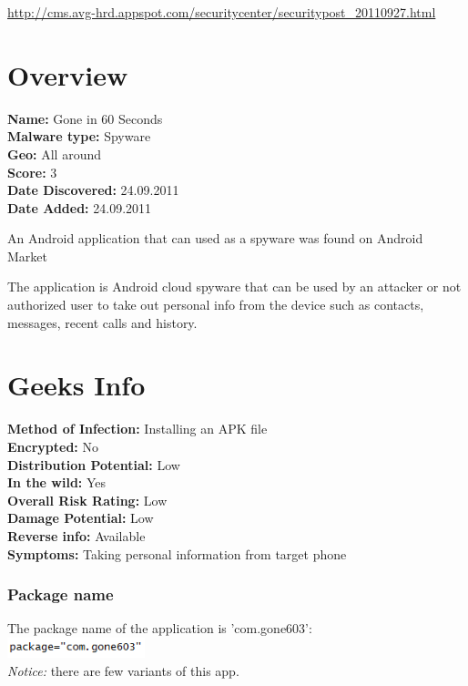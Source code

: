 \vspace{-15mm}
{\scriptsize\url{http://cms.avg-hrd.appspot.com/securitycenter/securitypost_20110927.html}}

\section{Overview}

\textbf{Name:} Gone in 60 Seconds \\
\textbf{Malware type:} Spyware \\
\textbf{Geo:} All around \\
\textbf{Score:} 3 \\
\textbf{Date Discovered:} 24.09.2011 \\
\textbf{Date Added:} 24.09.2011

An Android application that can used as a spyware was found on Android Market

The application is Android cloud spyware that can be used by an attacker or not authorized user to take out personal info from the device such as contacts, messages, recent calls and history.

\section{Geeks Info}

\textbf{Method of Infection:} Installing an APK file \\
\textbf{Encrypted:} No \\
\textbf{Distribution Potential:} Low \\
\textbf{In the wild:} Yes \\
\textbf{Overall Risk Rating:} Low \\
\textbf{Damage Potential:} Low \\
\textbf{Reverse info:} Available \\
\textbf{Symptoms:} Taking personal information from target phone

%

\subsubsection{Package name}
\parbox{\textwidth}{
The package name of the application is 'com.gone603': \\
\includegraphics[width=0.3\textwidth]{figs/gone60_3.png} \\
\emph{Notice:} there are few variants of this app.
}

